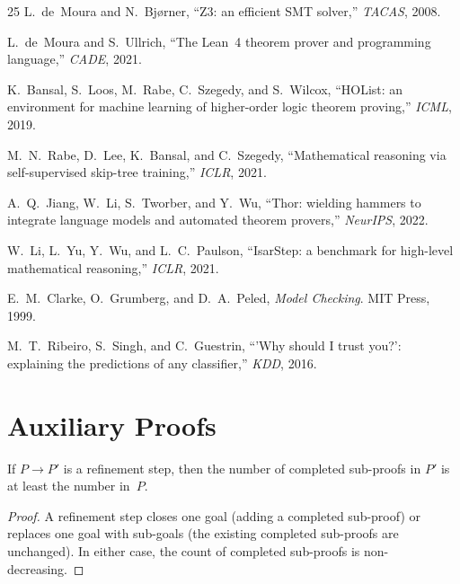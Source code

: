 \documentclass[11pt]{article}
\begin{document}
\begin{thebibliography}{25}
L.~de~Moura and N.~Bj{\o}rner,
``Z3: an efficient SMT solver,''
\emph{TACAS}, 2008.

L.~de~Moura and S.~Ullrich,
``The Lean~4 theorem prover and programming language,''
\emph{CADE}, 2021.

K.~Bansal, S.~Loos, M.~Rabe, C.~Szegedy, and S.~Wilcox,
``HOList: an environment for machine learning of higher-order
logic theorem proving,''
\emph{ICML}, 2019.

M.~N.~Rabe, D.~Lee, K.~Bansal, and C.~Szegedy,
``Mathematical reasoning via self-supervised skip-tree
training,''
\emph{ICLR}, 2021.

A.~Q.~Jiang, W.~Li, S.~Tworber, and Y.~Wu,
``Thor: wielding hammers to integrate language models and
automated theorem provers,''
\emph{NeurIPS}, 2022.

W.~Li, L.~Yu, Y.~Wu, and L.~C.~Paulson,
``IsarStep: a benchmark for high-level mathematical
reasoning,''
\emph{ICLR}, 2021.

E.~M.~Clarke, O.~Grumberg, and D.~A.~Peled,
\emph{Model Checking}.
MIT Press, 1999.

M.~T.~Ribeiro, S.~Singh, and C.~Guestrin,
``'Why should I trust you?': explaining the predictions
of any classifier,''
\emph{KDD}, 2016.

\end{thebibliography}

\appendix

\section{Auxiliary Proofs}\label{app:proofs}

\begin{lemma}%
\label{lem:refmono}
If $P \to P'$ is a refinement step, then the number of
completed sub-proofs in $P'$ is at least the number in~$P$.
\end{lemma}
\begin{proof}
A refinement step closes one goal (adding a completed sub-proof)
or replaces one goal with sub-goals (the existing completed
sub-proofs are unchanged).  In either case, the count of
completed sub-proofs is non-decreasing.
\end{proof}
\end{document}
